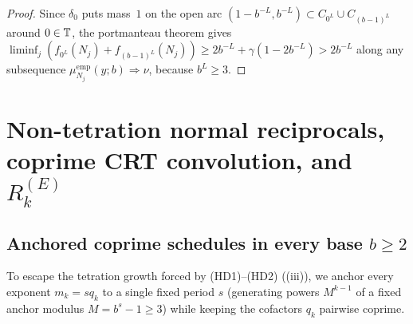 \documentclass[11pt]{article}
\begin{document}
\begin{proof}
Since $\delta_0$ puts mass~$1$ on the open arc $(1-b^{-L},b^{-L})\subset C_{0^L}\cup C_{(b-1)^L}$ around $0\in\mathbb T$, the portmanteau theorem gives $\liminf_j(f_{0^L}(N_j)+f_{(b-1)^L}(N_j))\ge 2b^{-L}+\gamma(1-2b^{-L})>2b^{-L}$ along any subsequence $\mu_{N_j}^{\mathrm{emp}}(y;b)\Rightarrow\nu$, because $b^L\ge3$.
\end{proof}

\section{Non-tetration normal reciprocals, coprime CRT convolution, and $R_k^{(E)}$}\label{sec:nontetration}

\subsection{Anchored coprime schedules in every base $b\ge2$}

To escape the tetration growth forced by \textup{(HD1)}--\textup{(HD2)} ((iii)), we anchor every exponent $m_k=sq_k$ to a single fixed period $s$ (generating powers $M^{k-1}$ of a fixed anchor modulus $M=b^s-1\ge3$) while keeping the cofactors $q_k$ pairwise coprime.
\end{document}
